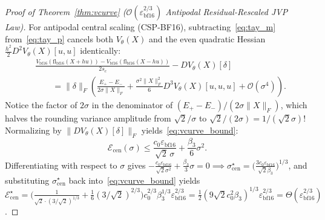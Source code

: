 \documentclass[11pt,a4paper]{article}
\theoremstyle{definition}
\theoremstyle{remark}
\newcommand{\epsbf}{\varepsilon_{\mathrm{bf16}}}
\begin{document}
\begin{proof}[Proof of Theorem~\ref{thm:vcurve} ($\mathcal{O}(\epsbf^{2/3})$ Antipodal Residual-Rescaled JVP Law)]
For antipodal central scaling (\textsc{CSP-BF16}), subtracting~\eqref{eq:tay_m} from~\eqref{eq:tay_p} cancels both $V_\theta(X)$ and the even quadratic Hessian $\frac{h^2}{2}D^2 V_\theta(X)[u, u]$ identically:
\begin{equation*}
\begin{aligned}
    &\frac{V_{\mathrm{bf16}}(\mathrm{fl}_{\mathrm{bf16}}(X + h u)) - V_{\mathrm{bf16}}(\mathrm{fl}_{\mathrm{bf16}}(X - h u))}{2 s_c} - D V_\theta(X)[\delta] \\
    &\qquad = \|\delta\|_F \left(\frac{E_+ - E_-}{2 \sigma \|X\|_F} + \frac{\sigma^2 \|X\|_F^2}{6} D^3 V_\theta(X)[u, u, u] + \mathcal{O}(\sigma^4)\right).
\end{aligned}
\end{equation*}
Notice the factor of $2\sigma$ in the denominator of $(E_+ - E_-)/(2\sigma \|X\|_F)$, which halves the rounding variance amplitude from $\sqrt{2}/\sigma$ to $\sqrt{2}/(2\sigma) = 1/(\sqrt{2}\sigma)$! Normalizing by $\|D V_\theta(X)[\delta]\|_F$ yields~\eqref{eq:vcurve_bound}:
\begin{equation*}
    \mathcal{E}_{\mathrm{cen}}(\sigma) \le \frac{c_0 \epsbf}{\sqrt{2}\,\sigma} + \frac{\beta_3}{6}\sigma^2.
\end{equation*}
Differentiating with respect to $\sigma$ gives $-\frac{c_0\epsbf}{\sqrt{2}\sigma^2} + \frac{\beta_3}{3}\sigma = 0 \implies \sigma_{\mathrm{cen}}^\star = \big(\frac{3 c_0 \epsbf}{\sqrt{2}\beta_3}\big)^{1/3}$, and substituting $\sigma_{\mathrm{cen}}^\star$ back into~\eqref{eq:vcurve_bound} yields $\mathcal{E}_{\mathrm{cen}}^\star = \big(\frac{1}{\sqrt{2}\cdot (3/\sqrt{2})^{1/3}} + \frac{1}{6}(3/\sqrt{2})^{2/3}\big) c_0^{2/3} \beta_3^{1/3} \epsbf^{2/3} = \frac{1}{2}(9\sqrt{2} c_0^2 \beta_3)^{1/3}\epsbf^{2/3} = \Theta(\epsbf^{2/3})$.
\end{proof}
\end{document}
